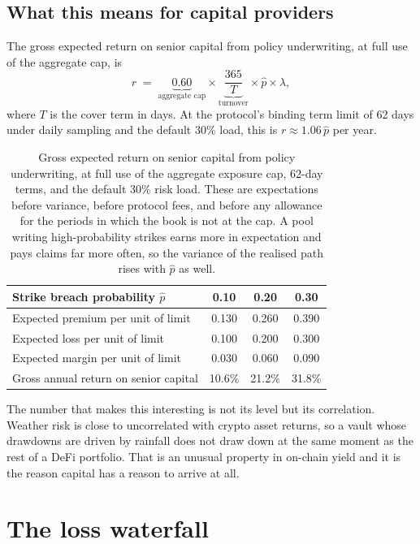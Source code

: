 \documentclass[11pt,a4paper]{article}
\begin{document}
\subsection{What this means for capital providers}

The gross expected return on senior capital from policy underwriting, at full use of the
aggregate cap, is
\[
  r \;=\; \underbrace{0.60}_{\text{aggregate cap}} \times
          \underbrace{\frac{365}{T}}_{\text{turnover}} \times
          \hat{p} \times \lambda ,
\]
where $T$ is the cover term in days. At the protocol's binding term limit of 62 days under
daily sampling and the default 30\% load, this is $r \approx 1.06\,\hat{p}$ per year.

\begin{table}[h]
\centering
\small
\setlength{\tabcolsep}{9pt}
\renewcommand{\arraystretch}{1.25}
\begin{tabular}{@{}lccc@{}}
\toprule
Strike breach probability $\hat{p}$ & 0.10 & 0.20 & 0.30 \\
\midrule
Expected premium per unit of limit & 0.130 & 0.260 & 0.390 \\
Expected loss per unit of limit & 0.100 & 0.200 & 0.300 \\
Expected margin per unit of limit & 0.030 & 0.060 & 0.090 \\
Gross annual return on senior capital & 10.6\% & 21.2\% & 31.8\% \\
\bottomrule
\end{tabular}
\caption{Gross expected return on senior capital from policy underwriting, at full use of the
aggregate exposure cap, 62-day terms, and the default 30\% risk load. These are expectations
before variance, before protocol fees, and before any allowance for the periods in which the
book is not at the cap. A pool writing high-probability strikes earns more in expectation and
pays claims far more often, so the variance of the realised path rises with $\hat{p}$ as well.}
\end{table}

The number that makes this interesting is not its level but its correlation. Weather risk is
close to uncorrelated with crypto asset returns, so a vault whose drawdowns are driven by
rainfall does not draw down at the same moment as the rest of a DeFi portfolio. That is an
unusual property in on-chain yield and it is the reason capital has a reason to arrive at all.

\section{The loss waterfall}
\label{sec:waterfall}
\end{document}
